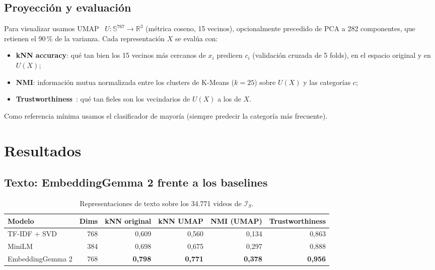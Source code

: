 \documentclass[11pt,a4paper]{article}
\newcommand{\R}{\mathbb{R}}
\newcommand{\Sph}{\mathbb{S}^{767}}
\begin{document}
\subsection{Proyección y evaluación}
Para visualizar usamos UMAP~\cite{umap} $U : \Sph \to \R^3$ (métrica coseno, 15 vecinos),
opcionalmente precedido de PCA a 282 componentes, que retienen el 90\,\% de la varianza.
Cada representación $X$ se evalúa con:
\begin{itemize}
  \item \textbf{kNN accuracy}: qué tan bien los 15 vecinos más cercanos de $x_i$ predicen
        $c_i$ (validación cruzada de 5 folds), en el espacio original y en $U(X)$;
  \item \textbf{NMI}: información mutua normalizada entre los clusters de K-Means ($k = 25$)
        sobre $U(X)$ y las categorías $c$;
  \item \textbf{Trustworthiness}~\cite{trust}: qué tan fieles son los vecindarios de $U(X)$
        a los de $X$.
\end{itemize}
Como referencia mínima usamos el clasificador de mayoría (siempre predecir la categoría más
frecuente).

\section{Resultados}
\label{sec:resultados}

\subsection{Texto: EmbeddingGemma 2 frente a los baselines}

\begin{table}[H]
  \centering
  \caption{Representaciones de texto sobre los 34.771 videos de $\mathcal{I}_S$.}
  \label{tab:texto}
  \small
  \begin{tabular}{lrrrrr}
    \toprule
    Modelo & Dims & kNN original & kNN UMAP & NMI (UMAP) & Trustworthiness \\
    \midrule
    TF-IDF + SVD     & 768 & 0,609 & 0,560 & 0,134 & 0,863 \\
    MiniLM           & 384 & 0,698 & 0,675 & 0,297 & 0,888 \\
    EmbeddingGemma 2 & 768 & \textbf{0,798} & \textbf{0,771} & \textbf{0,378} & \textbf{0,956} \\
    \bottomrule
  \end{tabular}
\end{table}
\end{document}
